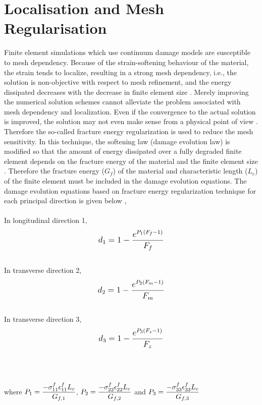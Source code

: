 \documentclass[12pt,openright,twoside]{report}
\begin{document}
\section{Localisation and Mesh Regularisation}\label{Mesh Regularisation}
\indent\indent\indent Finite element simulations which use continuum damage models are susceptible to mesh dependency.  Because of the strain-softening behaviour of the material, the strain tends to localize, resulting in a strong mesh dependency, i.e., the solution is non-objective with respect to mesh refinement, and the energy dissipated decreases with the decrease in finite element size \citep{lapczyk2007progressive}. Merely improving the numerical solution schemes cannot alleviate the problem associated with mesh dependency and localization. Even if the convergence to the actual solution is improved, the solution may not even make sense from a physical point of view \citep{peerlings1999enhanced}. Therefore the so-called fracture energy regularization is used to reduce the mesh sensitivity. In this technique, the softening law (damage evolution law) is modified so that the amount of energy dissipated over a fully degraded finite element depends on the fracture energy of the material and the finite element size \citep{cervera2006smeared}. Therefore the fracture energy ($G_f$) of the material and characteristic length ($L_{c}$) of the finite element must be included in the damage evolution equations. The damage evolution equations based on fracture energy regularization technique for each principal direction is given below \citep{wang2009three}, \\
\\
In longitudinal direction 1,
\begin{equation}
\label{d1}
\mathlarger{d_{1} = 1 - \frac{e^{P_{1}(F_{f} - 1)}}{F_{f}}}
\end{equation}
\\
In transverse direction 2,
\begin{equation}
\label{d2}  
\mathlarger{d_{2} = 1 - \frac{e^{P_{2}(F_{m} - 1)}}{F_{m}}}
\end{equation}
\\
In transverse direction 3,
\begin{equation}
\label{d3} 
\mathlarger{d_{3} = 1 - \frac{e^{P_{3}(F_{z} - 1)}}{F_{z}}}
\end{equation}
\\
\\
\\
where $\mathlarger{P_{1} = \frac{-\sigma_{11}^{f}\epsilon_{11}^{f}L_{c}}{G_{f,1}}}$, $\mathlarger{P_{2} = \frac{-\sigma_{22}^{f}\epsilon_{22}^{f}L_{c}}{G_{f,2}}}$ and $\mathlarger{P_{3} = \frac{-\sigma_{33}^{f}\epsilon_{33}^{f}L_{c}}{G_{f,3}}}$ 
\end{document}
